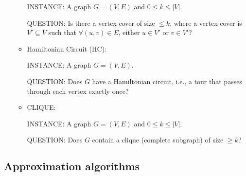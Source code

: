 \documentclass{article}
\begin{document}
\begin{itemize}
\begin{itemize}
INSTANCE: A graph $G=(V,E)$ and $0\le k\le |V|$.

QUESTION: Is there a vertex cover of size $\le k$, where a vertex
cover is $V'\subseteq V$ such that $\forall (u,v)\in E$, either
$u\in V'$ or $v\in V'$?

\item Hamiltonian Circuit (HC):

INSTANCE: A graph $G=(V,E)$.

QUESTION: Does $G$ have a Hamiltonian circuit, i.e., a tour that
passes through each vertex exactly once?

\item CLIQUE:

INSTANCE: A graph $G=(V,E)$ and $0\le k\le |V|$.

QUESTION: Does $G$ contain a clique (complete subgraph) of size $\ge k$?

\end{itemize}

\end{itemize}

\newpage

\subsection{Approximation algorithms}
\end{document}

